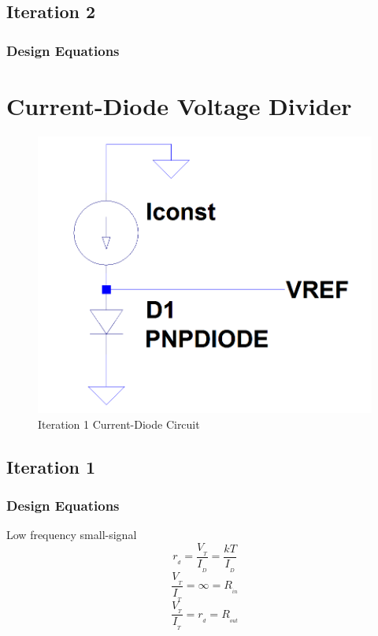 \documentclass[conference]{IEEEtran}
\begin{document}
\subsection{Iteration 2}
\subsubsection{Design Equations}

\section{Current-Diode Voltage Divider}
\begin{figure}[htb]
  \centering
  \includegraphics[scale=0.25]{images/cm-diode1.png}
  \caption[cm-diode1]{Iteration 1 Current-Diode Circuit}
  \label{fig:cm-diode1}
\end{figure}
\subsection{Iteration 1}
\subsubsection{Design Equations}

Low frequency small-signal
\begin{equation}
  r_{_d} = \frac{V_{_T}}{I_{_D}} = \frac{kT}{I_{_D}}
\end{equation}
\begin{equation}
  \frac{V_{_T}}{I_{_T}} = \infty = R_{_{in}}
\end{equation}
\begin{equation}
  \frac{V_{_T}}{I_{_T}} = r_{_d} = R_{_{out}}
\end{equation}
\end{document}
